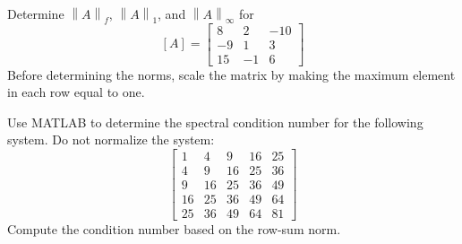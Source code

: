 \documentclass{article}
\begin{document}
\setcounter{problem}{5}
\begin{problem}
Determine $\left\| A \right\|_{f}$, $\left\| A \right\|_{1}$, and $\left\| A \right\|_{\infty}$ for
\[ [A] =
\begin{bmatrix}
8	&	2	&	-10	\\
-9	&	1	&	3	\\
15	&	-1	&	6
\end{bmatrix}
\]
Before determining the norms, scale the matrix by making the maximum element in each row equal to one.
\end{problem}

\setcounter{problem}{7}
\begin{problem}
Use MATLAB to determine the spectral condition number for the following system. Do not normalize the system:
\[
\begin{bmatrix}
1	&	4	&	9	&	16	&	25	\\
4	&	9	&	16	&	25	&	36	\\
9	&	16	&	25	&	36	&	49	\\
16	&	25	&	36	&	49	&	64	\\
25	&	36	&	49	&	64	&	81	
\end{bmatrix}
\]
Compute the condition number based on the row-sum norm.
\end{problem}
\end{document}
